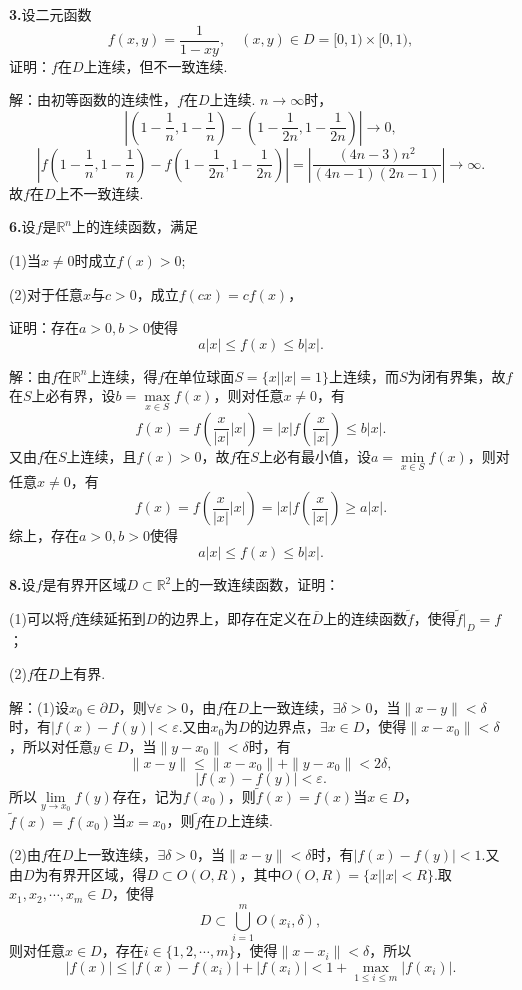 \documentclass[12pt, a4paper]{article}
\newcommand{\RR}{\mathbb{R}}
\begin{document}
\textbf{3.}设二元函数
\[f(x, y) = \dfrac{1}{1 - xy}, \quad (x, y) \in D = [0, 1) \times [0, 1),\]
证明：\(f\)在\(D\)上连续，但不一致连续.

解：由初等函数的连续性，\(f\)在\(D\)上连续. \(n \to \infty\)时，
\[\left|(1 - \frac{1}{n}, 1 - \frac{1}{n}) - (1 - \frac{1}{2n}, 1 - \frac{1}{2n})\right| \to 0,\]
\[\left|f(1 - \frac{1}{n}, 1 - \frac{1}{n}) - f(1 - \frac{1}{2n}, 1 - \frac{1}{2n})\right| = \left|\frac{(4n - 3)n^2}{(4n - 1)(2n - 1)}\right| \to \infty.\]
故\(f\)在\(D\)上不一致连续.

\textbf{6.}设\(f\)是\(\RR^n\)上的连续函数，满足

(1)当\(x \neq 0\)时成立\(f(x) > 0\);

(2)对于任意\(x\)与\(c > 0\)，成立\(f(cx) = cf(x)\)，

证明：存在\(a > 0, b > 0\)使得
\[a|x| \leq f(x) \leq b|x|.\]

解：由\(f\)在\(\RR^n\)上连续，得\(f\)在单位球面\(S = \{x | |x| = 1\}\)上连续，而\(S\)为闭有界集，故\(f\)在\(S\)上必有界，设\(b = \max\limits_{x \in S} f(x)\)，则对任意\(x \neq 0\)，有
\[f(x) = f\left(\frac{x}{|x|}|x|\right) = |x|f\left(\frac{x}{|x|}\right) \leq b|x|.\]
又由\(f\)在\(S\)上连续，且\(f(x) > 0\)，故\(f\)在\(S\)上必有最小值，设\(a = \min\limits_{x \in S} f(x)\)，则对任意\(x \neq 0\)，有
\[f(x) = f\left(\frac{x}{|x|}|x|\right) = |x|f\left(\frac{x}{|x|}\right) \geq a|x|.\]
综上，存在\(a > 0, b > 0\)使得
\[a|x| \leq f(x) \leq b|x|.\]

\textbf{8.}设\(f\)是有界开区域\(D \subset \RR^2\)上的一致连续函数，证明：

(1)可以将\(f\)连续延拓到\(D\)的边界上，即存在定义在\(\bar{D}\)上的连续函数\(\tilde{f}\)，使得\(\tilde{f}|_D = f\)；

(2)\(f\)在\(D\)上有界.

解：(1)设\(x_0 \in \partial D\)，则\(\forall \varepsilon > 0\)，由\(f\)在\(D\)上一致连续，\(\exists \delta > 0\)，当\(\|x - y\| < \delta\)时，有\(|f(x) - f(y)| < \varepsilon\).又由\(x_0\)为\(D\)的边界点，\(\exists x \in D\)，使得\(\|x - x_0\| < \delta\)，所以对任意\(y \in D\)，当\(\|y - x_0\| < \delta\)时，有
\[\|x - y\| \leq \|x - x_0\| + \|y - x_0\| < 2\delta,\]
\[|f(x) - f(y)| < \varepsilon.\]
所以\(\lim\limits_{y \to x_0} f(y)\)存在，记为\(f(x_0)\)，则\(\tilde{f}(x) = f(x)\)当\(x \in D\)，\(\tilde{f}(x) = f(x_0)\)当\(x = x_0\)，则\(\tilde{f}\)在\(D\)上连续.

(2)由\(f\)在\(D\)上一致连续，\(\exists \delta > 0\)，当\(\|x - y\| < \delta\)时，有\(|f(x) - f(y)| < 1\).又由\(D\)为有界开区域，得\(D \subset O(O, R)\)，其中\(O(O, R) = \{x | |x| < R\}\).取\(x_1, x_2, \cdots, x_m \in D\)，使得
\[D \subset \bigcup_{i = 1}^m O(x_i, \delta),\]
则对任意\(x \in D\)，存在\(i\in \{1, 2, \cdots, m\}\)，使得\(\|x - x_i\| < \delta\)，所以
\[|f(x)| \leq |f(x) - f(x_i)| + |f(x_i)| < 1 + \max_{1 \leq i \leq m} |f(x_i)|.\]
\end{document}

